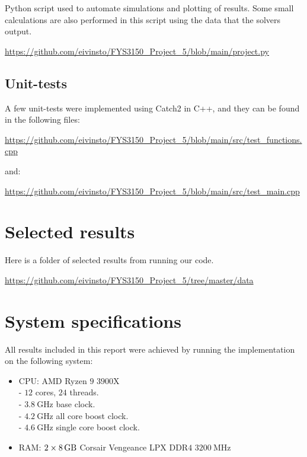 \documentclass[reprint,english,notitlepage]{revtex4-1}  %
\begin{document}
Python script used to automate simulations and plotting of results. Some small calculations are also performed in this script using the data that the solvers output. 


\url{https://github.com/eivinsto/FYS3150_Project_5/blob/main/project.py}


\cprotect\subsection{Unit-tests} \label{A.7}

A few unit-tests were implemented using Catch2 in C++, and they can be found in the following files:

\url{https://github.com/eivinsto/FYS3150_Project_5/blob/main/src/test_functions.cpp}

and:

\url{https://github.com/eivinsto/FYS3150_Project_5/blob/main/src/test_main.cpp} 

\clearpage
\section{Selected results} \label{B}
Here is a folder of selected results from running our code.

\url{https://github.com/eivinsto/FYS3150_Project_5/tree/master/data}

\newpage
\section{System specifications} \label{C}
All results included in this report were achieved by running the implementation on the following system:

\begin{itemize}
	\item CPU: AMD Ryzen \(9\) \(3900\)X \\
		- \(12\) cores, \(24\) threads. \\ 
		- \(\SI{3.8}{\giga\hertz}\) base clock. \\
		- \(\SI{4.2}{\giga\hertz}\) all core boost clock. \\
		- \(\SI{4.6}{\giga\hertz}\) single core boost clock. \\
	\item RAM: \(2\times\SI{8}{\giga\byte}\) Corsair Vengeance LPX DDR\(4\) \(\SI{3200}{\mega\hertz}\)
\end{itemize}
\end{document}
